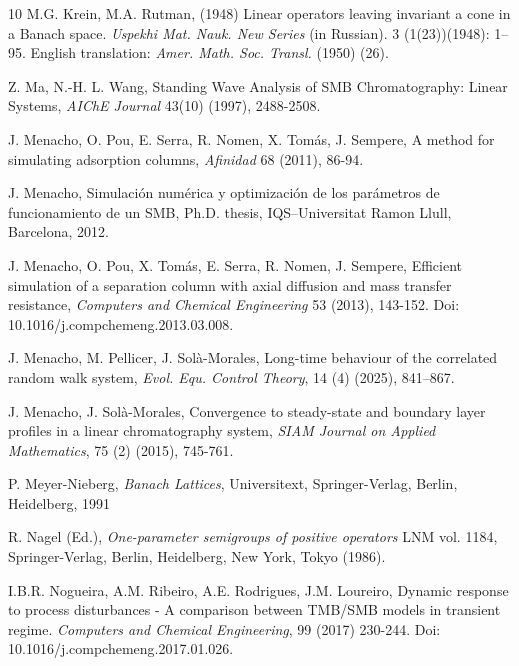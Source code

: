 \documentclass[a4paper]{article}
\numberwithin{equation}{section}
\begin{document}
\begin{thebibliography}{10}
M.G. Krein, M.A. Rutman, (1948) {Linear operators leaving invariant a cone in a Banach space}. {\it Uspekhi Mat. Nauk. New Series} (in Russian). 3 (1(23))(1948): 1–95. English translation: {\it Amer. Math. Soc. Transl.} (1950) (26).

Z. Ma, N.-H. L. Wang, Standing Wave Analysis of SMB Chromatography: Linear Systems, {\it AIChE Journal} 43(10) (1997), 2488-2508.


J. Menacho, O. Pou, E. Serra, R. Nomen, X. Tomás, J. Sempere, A method for simulating adsorption columns, {\it Afinidad} 68 (2011), 86-94.

J. Menacho, Simulación numérica y optimización de los parámetros de funcionamiento de un SMB, Ph.D. thesis, IQS–Universitat Ramon Llull, Barcelona, 2012.

J. Menacho, O. Pou, X. Tomás, E. Serra, R. Nomen, J. Sempere, Efficient simulation of a separation column with axial diffusion and mass transfer resistance, {\it Computers and Chemical Engineering} 53 (2013), 143-152. Doi: 10.1016/j.compchemeng.2013.03.008.

J. Menacho, M. Pellicer, J. Sol\`a-Morales, Long-time behaviour of the correlated random walk system, {\it Evol. Equ. Control Theory}, {14 (4)} (2025), 841--867.

J. Menacho, J. Solà-Morales, Convergence to steady-state and boundary layer profiles in a linear chromatography system, {\it SIAM Journal on Applied Mathematics}, 75 (2) (2015), 745-761.

P. Meyer-Nieberg, {\it Banach Lattices}, Universitext, Springer-Verlag, Berlin, Heidelberg, 1991

R. Nagel (Ed.), {\it One-parameter semigroups of positive operators} LNM vol. 1184, Springer-Verlag, Berlin, Heidelberg, New York, Tokyo (1986).

I.B.R. Nogueira, A.M. Ribeiro, A.E. Rodrigues, J.M. Loureiro, Dynamic response to process disturbances - A comparison between TMB/SMB models in transient regime. \textit{Computers and Chemical Engineering}, {99} (2017) 230-244. Doi: 10.1016/j.compchemeng.2017.01.026.


\end{thebibliography}
\end{document}
